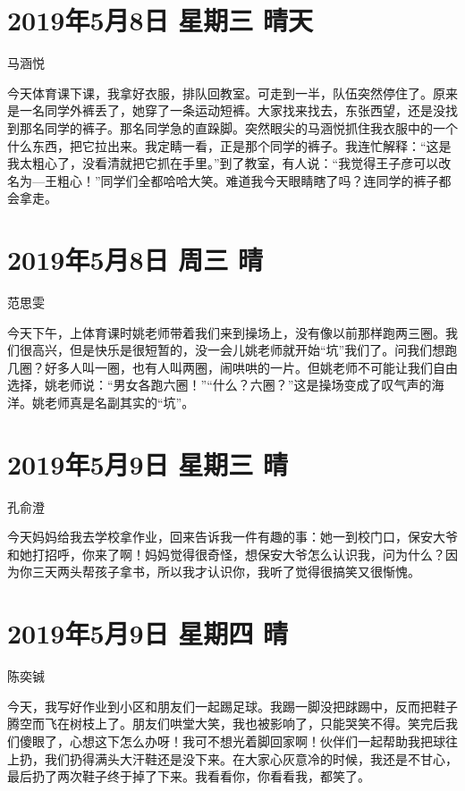 \section{2019年5月8日 星期三 晴天}

马涵悦

今天体育课下课，我拿好衣服，排队回教室。可走到一半，队伍突然停住了。原来是一名同学外裤丢了，她穿了一条运动短裤。大家找来找去，东张西望，还是没找到那名同学的裤子。那名同学急的直跺脚。突然眼尖的马涵悦抓住我衣服中的一个什么东西，把它拉出来。我定睛一看，正是那个同学的裤子。我连忙解释：``这是我太粗心了，没看清就把它抓在手里。''到了教室，有人说：``我觉得王子彦可以改名为---王粗心！''同学们全都哈哈大笑。难道我今天眼睛瞎了吗？连同学的裤子都会拿走。

\section{2019年5月8日 周三 晴}

范思雯

今天下午，上体育课时姚老师带着我们来到操场上，没有像以前那样跑两三圈。我们很高兴，但是快乐是很短暂的，没一会儿姚老师就开始``坑''我们了。问我们想跑几圈？好多人叫一圈，也有人叫两圈，闹哄哄的一片。但姚老师不可能让我们自由选择，姚老师说：``男女各跑六圈！''``什么？六圈？''这是操场变成了叹气声的海洋。姚老师真是名副其实的``坑''。

\section{2019年5月9日 星期三 晴}

孔俞澄

今天妈妈给我去学校拿作业，回来告诉我一件有趣的事：她一到校门口，保安大爷和她打招呼，你来了啊！妈妈觉得很奇怪，想保安大爷怎么认识我，问为什么？因为你三天两头帮孩子拿书，所以我才认识你，我听了觉得很搞笑又很惭愧。

\section{2019年5月9日 星期四 晴}

陈奕铖

今天，我写好作业到小区和朋友们一起踢足球。我踢一脚没把䟵踢中，反而把鞋子腾空而飞在树枝上了。朋友们哄堂大笑，我也被影响了，只能哭笑不得。笑完后我们傻眼了，心想这下怎么办呀！我可不想光着脚回家啊！伙伴们一起帮助我把球往上扔，我们扔得满头大汗鞋还是没下来。在大家心灰意冷的时候，我还是不甘心，最后扔了两次鞋子终于掉了下来。我看看你，你看看我，都笑了。

